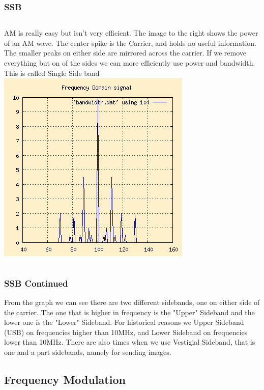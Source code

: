 \documentclass[10pt]{beamer}
\begin{document}
\begin{frame}
\frametitle{SSB }
\begin{columns}
AM is really easy but isn't very efficient. The image to the right shows the power of an AM wave. The center spike is the Carrier, and holds no useful information. The smaller peaks on either side are mirrored across the carrier. If we remove everything but on of the sides we can more efficiently use power and bandwidth. This is called Single Side band
\includegraphics[width=\textwidth]{amfft.png}
\end{columns}
\end{frame}


\begin{frame}
\frametitle{SSB Continued}
From the graph we can see there are two different sidebands, one on either side of the carrier. The one that is higher in frequency is the "Upper" Sideband and the lower one is the "Lower" Sideband. For historical reasons we Upper Sideband (USB) on frequencies higher than 10MHz, and Lower Sideband on frequencies lower than 10MHz. There are also times when we use Vestigial Sideband, that is one and a part sidebands, namely for sending images.
\end{frame}

\subsection{Frequency Modulation}
\end{document}
